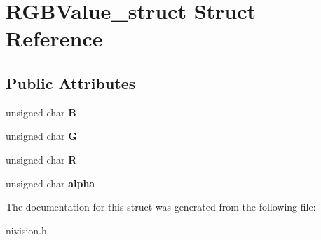 \hypertarget{structRGBValue__struct}{
\section{RGBValue\_\-struct Struct Reference}
\label{structRGBValue__struct}
}
\subsection*{Public Attributes}
\begin{DoxyCompactItemize}
\item 
\hypertarget{structRGBValue__struct_a73c865a0825e7219a8c1ed41dbf677d6}{
unsigned char {\bfseries B}}
\label{structRGBValue__struct_a73c865a0825e7219a8c1ed41dbf677d6}

\item 
\hypertarget{structRGBValue__struct_afe8cb752bc2c0b38bc2bff01e6ae1bbb}{
unsigned char {\bfseries G}}
\label{structRGBValue__struct_afe8cb752bc2c0b38bc2bff01e6ae1bbb}

\item 
\hypertarget{structRGBValue__struct_ab7da47821d67f7ff7dea148bd4a790e4}{
unsigned char {\bfseries R}}
\label{structRGBValue__struct_ab7da47821d67f7ff7dea148bd4a790e4}

\item 
\hypertarget{structRGBValue__struct_a780de0fe393841107283d21630f9e04a}{
unsigned char {\bfseries alpha}}
\label{structRGBValue__struct_a780de0fe393841107283d21630f9e04a}

\end{DoxyCompactItemize}


The documentation for this struct was generated from the following file:\begin{DoxyCompactItemize}
\item 
nivision.h\end{DoxyCompactItemize}

